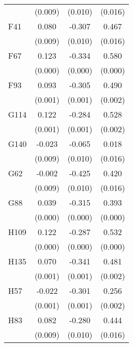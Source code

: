 \begin{table}[htbp]
\begin{tabular}{l*{3}{c}}
                &  (0.009)         &  (0.010)         &  (0.016)         \\
F41             &    0.080\sym{***}&   -0.307\sym{***}&    0.467\sym{***}\\
                &  (0.009)         &  (0.010)         &  (0.016)         \\
F67             &    0.123\sym{***}&   -0.334\sym{***}&    0.580\sym{***}\\
                &  (0.000)         &  (0.000)         &  (0.000)         \\
F93             &    0.093\sym{***}&   -0.305\sym{***}&    0.490\sym{***}\\
                &  (0.001)         &  (0.001)         &  (0.002)         \\
G114            &    0.122\sym{***}&   -0.284\sym{***}&    0.528\sym{***}\\
                &  (0.001)         &  (0.001)         &  (0.002)         \\
G140            &   -0.023\sym{**} &   -0.065\sym{***}&    0.018         \\
                &  (0.009)         &  (0.010)         &  (0.016)         \\
G62             &   -0.002         &   -0.425\sym{***}&    0.420\sym{***}\\
                &  (0.009)         &  (0.010)         &  (0.016)         \\
G88             &    0.039\sym{***}&   -0.315\sym{***}&    0.393\sym{***}\\
                &  (0.000)         &  (0.000)         &  (0.000)         \\
H109            &    0.122\sym{***}&   -0.287\sym{***}&    0.532\sym{***}\\
                &  (0.000)         &  (0.000)         &  (0.000)         \\
H135            &    0.070\sym{***}&   -0.341\sym{***}&    0.481\sym{***}\\
                &  (0.001)         &  (0.001)         &  (0.002)         \\
H57             &   -0.022\sym{***}&   -0.301\sym{***}&    0.256\sym{***}\\
                &  (0.001)         &  (0.001)         &  (0.002)         \\
H83             &    0.082\sym{***}&   -0.280\sym{***}&    0.444\sym{***}\\
                &  (0.009)         &  (0.010)         &  (0.016)         \\

\end{tabular}
\end{table}
